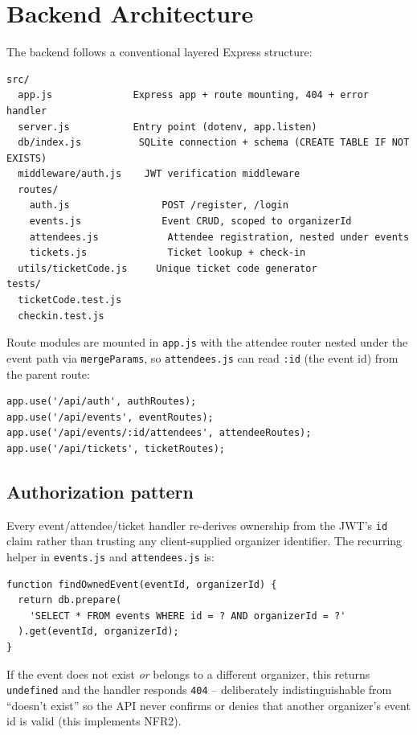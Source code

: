 ﻿\documentclass[11pt,letterpaper]{report}
\newcommand{\code}[1]{\lstinline[breaklines=true]{#1}}
\begin{document}
\section{Backend Architecture}

The backend follows a conventional layered Express structure:

\begin{lstlisting}[caption={Backend source layout}]
src/
  app.js              Express app + route mounting, 404 + error handler
  server.js           Entry point (dotenv, app.listen)
  db/index.js          SQLite connection + schema (CREATE TABLE IF NOT EXISTS)
  middleware/auth.js    JWT verification middleware
  routes/
    auth.js                POST /register, /login
    events.js              Event CRUD, scoped to organizerId
    attendees.js            Attendee registration, nested under events
    tickets.js              Ticket lookup + check-in
  utils/ticketCode.js     Unique ticket code generator
tests/
  ticketCode.test.js
  checkin.test.js
\end{lstlisting}

Route modules are mounted in \code{app.js} with the attendee router
nested under the event path via \code{mergeParams}, so
\code{attendees.js} can read \code{:id} (the event id) from the parent
route:

\begin{lstlisting}[caption={Route mounting (app.js)}]
app.use('/api/auth', authRoutes);
app.use('/api/events', eventRoutes);
app.use('/api/events/:id/attendees', attendeeRoutes);
app.use('/api/tickets', ticketRoutes);
\end{lstlisting}

\subsection{Authorization pattern}

Every event/attendee/ticket handler re-derives ownership from the
JWT's \code{id} claim rather than trusting any client-supplied
organizer identifier. The recurring helper in \code{events.js} and
\code{attendees.js} is:

\begin{lstlisting}[caption={Ownership scoping helper}]
function findOwnedEvent(eventId, organizerId) {
  return db.prepare(
    'SELECT * FROM events WHERE id = ? AND organizerId = ?'
  ).get(eventId, organizerId);
}
\end{lstlisting}

If the event does not exist \emph{or} belongs to a different
organizer, this returns \code{undefined} and the handler responds
\code{404} -- deliberately indistinguishable from ``doesn't exist'' so
the API never confirms or denies that another organizer's event id is
valid (this implements NFR2).
\end{document}
